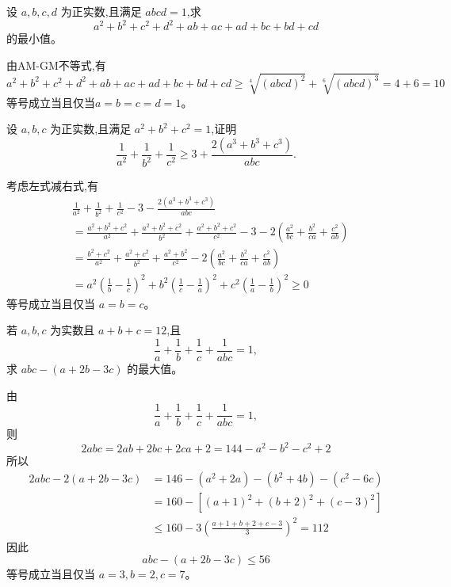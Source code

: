 \begin{questions}
    \question 设 $a,b,c,d$ 为正实数,且满足 $abcd=1$,求
    \[
    a^2+b^2+c^2+d^2+ab+ac+ad+bc+bd+cd
    \]
    的最小值。
    \begin{solution}
        由AM-GM不等式,有
        \[
        a^2+b^2+c^2+d^2+ab+ac+ad+bc+bd+cd \ge \sqrt[4]{(abcd)^2} + \sqrt[6]{(abcd)^3}= 4+6=10
        \]
        等号成立当且仅当$a=b=c=d=1$。
    \end{solution}

    \question 设 $a,b,c$ 为正实数,且满足 $a^2+b^2+c^2 = 1$,证明
    \[
    \frac{1}{a^2} + \frac{1}{b^2} + \frac{1}{c^2} \ge 3 + \frac{2(a^3+b^3+c^3)}{abc}.
    \]
    \begin{solution}
        考虑左式减右式,有
        \begin{align*}
        &\frac{1}{a^2} + \frac{1}{b^2} + \frac{1}{c^2} - 3 - \frac{2(a^3+b^3+c^3)}{abc} \\
        &= \frac{a^2+b^2+c^2}{a^2} + \frac{a^2+b^2+c^2}{b^2} + \frac{a^2+b^2+c^2}{c^2} - 3 - 2 \left(\frac{a^2}{bc} + \frac{b^2}{ca} + \frac{c^2}{ab}\right) \\
        &= \frac{b^2+c^2}{a^2} + \frac{a^2+c^2}{b^2} + \frac{a^2+b^2}{c^2} - 2 \left(\frac{a^2}{bc} + \frac{b^2}{ca} + \frac{c^2}{ab}\right) \\
        &= a^2\left(\frac{1}{b} - \frac{1}{c}\right)^2 + b^2\left(\frac{1}{c} - \frac{1}{a}\right)^2 + c^2\left(\frac{1}{a} - \frac{1}{b}\right)^2 \ge 0
        \end{align*}
        等号成立当且仅当 $a = b = c$。
    \end{solution}

    \question 若 $a,b,c$ 为实数且 $a+b+c=12$,且
    \[
    \frac{1}{a}+\frac{1}{b}+\frac{1}{c}+\frac{1}{abc}=1,
    \]  
    求 $abc-(a+2b-3c)$ 的最大值。
    \begin{solution}
        由
        \[
        \frac{1}{a}+\frac{1}{b}+\frac{1}{c}+\frac{1}{abc}=1,
        \] 
        则
        \[
        2abc=2ab+2bc+2ca+2=144-a^2-b^2-c^2+2
        \]
        所以
        \begin{align*}
        2abc - 2(a+2b-3c) 
        &= 146 - (a^2+2a)-(b^2+4b)-(c^2-6c) \\
        &= 160 - [(a+1)^2+(b+2)^2+(c-3)^2] \\
        &\le 160-3\left(\frac{a+1+b+2+c-3}{3}\right)^2=112        
        \end{align*}
        因此
        \[
        abc-(a+2b-3c) \le 56
        \]  
        等号成立当且仅当 $a=3, b=2, c=7$。
    \end{solution}


\end{questions}
